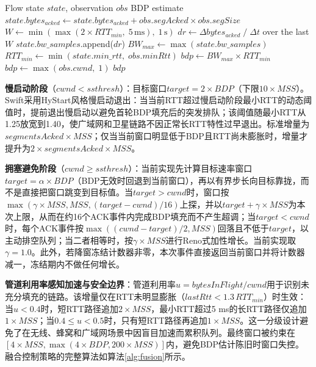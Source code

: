 \documentclass[10pt,twocolumn]{article}
\begin{document}
\begin{algorithm}[htbp]
\caption{Windowed Max-Filter BDP Estimation}
\label{alg:bdp}
\small
\begin{algorithmic}[1]
\REQUIRE Flow state $state$, observation $obs$
\ENSURE BDP estimate
\STATE $state.bytes_{acked} \leftarrow state.bytes_{acked} + obs.segAcked \times obs.segSize$
\STATE $W \leftarrow \min(\max(2 \times RTT_{min}, \; 5\,\text{ms}), \; 1\,\text{s})$ 
\STATE $dr \leftarrow \Delta bytes_{acked} \;/\; \Delta t$ over the last $W$ 
\STATE $state.bw\_samples$.append($dr$) 
\STATE $BW_{max} \leftarrow \max(state.bw\_samples)$
\STATE $RTT_{min} \leftarrow \min(state.min\_rtt, \; obs.minRtt)$
\STATE $bdp \leftarrow BW_{max} \times RTT_{min}$
    \STATE $bdp \leftarrow \max(obs.cwnd, \; 1)$ 
\ENDIF
\RETURN $bdp$
\end{algorithmic}
\end{algorithm}

\textbf{慢启动阶段}（$cwnd < ssthresh$）：目标窗口$target = 2 \times BDP$（下限$10 \times MSS$）。Swift采用HyStart风格慢启动退出：当当前RTT超过慢启动阶段最小RTT的动态阈值时，提前退出慢启动以避免首轮BDP填充后的突发排队；该阈值随最小RTT从1.25放宽到1.40，使广域网和卫星链路不因正常长RTT特性过早退出。标准增量为$segmentsAcked \times MSS$；仅当当前窗口明显低于BDP且RTT尚未膨胀时，增量才提升为$2 \times segmentsAcked \times MSS$。

\textbf{拥塞避免阶段}（$cwnd \geq ssthresh$）：当前实现先计算目标速率窗口$target=\alpha \times BDP$（BDP无效时回退到当前窗口），再以有界步长向目标靠拢，而不是直接把窗口跳变到目标值。当$target>cwnd$时，窗口按$\max(\gamma\times MSS, MSS, (target-cwnd)/16)$上探，并以$target+\gamma\times MSS$为本次上限，从而在约16个ACK事件内完成BDP填充而不产生超调；当$target<cwnd$时，每个ACK事件按$\max((cwnd-target)/2, MSS)$回落且不低于$target$，以主动排空队列；当二者相等时，按$\gamma\times MSS$进行Reno式加性增长。当前实现取$\gamma=1.0$。此外，若降窗冻结计数器非零，本次事件直接返回当前窗口并将计数器减一，冻结期内不做任何增长。

\textbf{管道利用率感知加速与安全边界}：管道利用率$u = bytesInFlight/cwnd$用于识别未充分填充的链路。该增量仅在RTT未明显膨胀（$lastRtt < 1.3\,RTT_{min}$）时生效：当$u<0.4$时，短RTT路径追加$2\times MSS$，最小RTT超过5 ms的长RTT路径仅追加$1\times MSS$；当$0.4 \leq u<0.5$时，只有短RTT路径再追加$1\times MSS$。这一分级设计避免了在无线、蜂窝和广域网场景中因盲目加速而累积队列。最终窗口被约束在$[4\times MSS, \max(4\times BDP, 200\times MSS)]$内，避免BDP估计陈旧时窗口失控。融合控制策略的完整算法如算法\ref{alg:fusion}所示。
\end{document}
